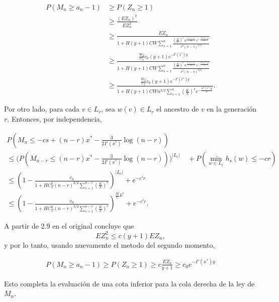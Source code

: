 \documentclass[12pt]{report}
\begin{document}
\[
\begin{aligned}
P(M_n \geq a_n - 1) 
&\geq P(Z_n \geq 1) \\
&\geq \frac{(E Z_n)^2}{E Z_n^2} \\
&\geq \frac{E Z_n}{1 + H (y + 1) C W 
    \sum_{s = 1}^{n} 
    \frac{\left(\tfrac{K}{k}\right)^s \, n^{\tfrac{3(n + s)}{2n}} \, e^{- \tfrac{s I'(x^*) y}{n}}}
         {s^3 (n - s)^{3/2}} } \\
&\geq \frac{\tfrac{W_T}{C_T} c_0 (y+1) e^{-I'(x^*)y}}
{1 + H (y + 1) C W 
    \sum_{s = 1}^{n} 
    \frac{\left(\tfrac{K}{k}\right)^s \, n^{\tfrac{3(n + s)}{2n}} \, e^{- \tfrac{s I'(x^*) y}{n}}}
         {s^3 (n - s)^{3/2}} } \\
&\geq \frac{\tfrac{W_T}{C_T} c_0 (y+1) e^{-I'(x^*)y}}
{1 + H (y + 1) C W n^{3/2}
    \sum_{s = 1}^{n} {
    \left(\tfrac{K}{k}\right)^s} e^{- \tfrac{s I'(x^*) y}{n}}}.
\end{aligned}
\]


Por otro lado, para cada $ v \in L_r $, sea $ w(v) \in L_r $ el ancestro de $v$ en la generación $r$. Entonces, por independencia,

\[
\begin{aligned}
P\!\left(M_n \leq -cs + (n - r)x^* - \tfrac{3}{2I'(x^*)} \log(n - r) \right) \\
\leq \Big( P\!\left(M_{n-r} \leq (n - r)x^* - \tfrac{3}{2I'(x^*)}\log(n - r)\right) \Big)^{|L_r|} 
\quad + P\!\left( \min_{w \in L_r} h_s(w) \leq -cr \right)\\
\leq \left(1 - \frac{c_0}
{1 + H C_T ^2 (n-r)^{3/2}
    \sum_{s = 1}^{n-r} 
    \left(\tfrac{K}{k}\right)^s} 
          \right)^{|L_r|} + e^{-c'r} \\
\leq \left(1 - \frac{c_0}
{1 + H C_T ^2 (n-r)^{3/2}
    \sum_{s = 1}^{n-r} 
    \left(\tfrac{K}{k}\right)^s} 
          \right)^{\frac{W}{C} k^r} + e^{-c'r}.
\end{aligned}
\]




\vspace{5em}
A partir de 2.9 en el original concluye que
\[
E Z_n^2 \leq c(y+1) E Z_n,
\]
y por lo tanto, usando nuevamente el metodo del segundo momento,

\begin{align}
P(M_n \geq a_n - 1) \geq P(Z_n \geq 1) \geq c \frac{E Z_n}{y+1} \geq c_0 e^{-I'(x^*) y}
\end{align}

Esto completa la evaluación de una cota inferior para la cola derecha de la ley de $M_n$.
\end{document}
